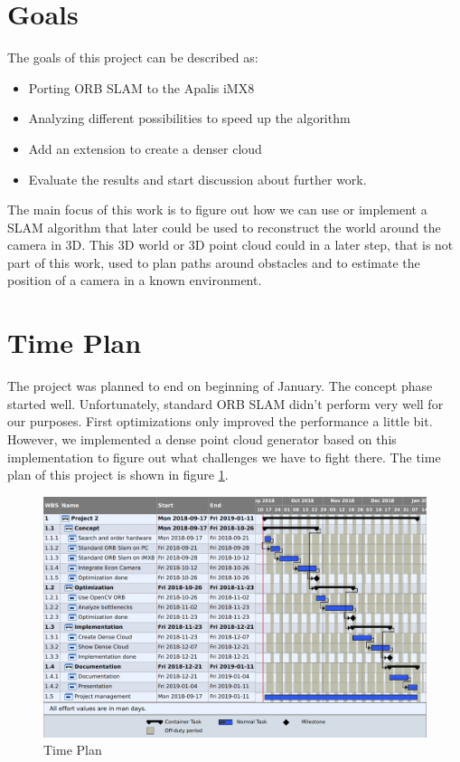 \documentclass[11pt,a4paper,titlepage,oneside]{report}
\begin{document}
\section{Goals}
The goals of this project can be described as:
\begin{itemize}
\item Porting ORB SLAM to the Apalis iMX8
\item Analyzing different possibilities to speed up the algorithm
\item Add an extension to create a denser cloud
\item Evaluate the results and start discussion about further work.
\end{itemize}

The main focus of this work is to figure out how we can use or implement a SLAM algorithm that later could be used to reconstruct the world around the camera in 3D. This 3D world or 3D point cloud could in a later step, that is not part of this work, used to plan paths around obstacles and to estimate the position of a camera in a known environment.

\section{Time Plan}

The project was planned to end on beginning of January. The concept phase started well. Unfortunately, standard ORB SLAM didn't perform very well for our purposes. First optimizations only improved the performance a little bit. However, we implemented a dense point cloud generator based on this implementation to figure out what challenges we have to fight there. The time plan of this project is shown in figure \ref{fig:timeplan}.
\begin{figure}[H]
	\includegraphics[width=1.0\textwidth]{img/timeplan.png}
	\caption{Time Plan}\label{fig:timeplan}
\end{figure}
\end{document}
